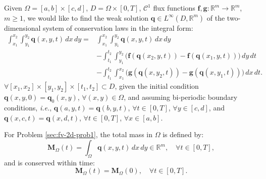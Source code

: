 \begin{prob}
	\label{sec:fv-2d-prob1}
	Given $\Omega = [a,b]\times [c,d]$, $D = \Omega \times [0,T]$, 
	$\mathcal{C}^1$ flux functions $\mathbf{f},
	\mathbf{g}: \mathbb{R}^m \to \mathbb{R}^m$,
	$m \geq 1$, we would like to find the weak solution
	$ \mathbf{q} \in L^{\infty}(D, \mathbb{R}^m)$ 
	of the two-dimensional system of conservation laws in the integral form:
	\begin{align*}
		\int_{x_1}^{x_2} \int_{y_1}^{y_2}
		\mathbf{q}(x, y, t) \,dx \,dy = &\int_{x_1}^{x_2} \int_{y_1}^{y_2}
		\mathbf{q}(x, y, t) \,dx \,dy \\ \nonumber
		&-\int_{t_1}^{t_2} \int_{y_1}^{y_2} \bigg(\mathbf{f}(\mathbf{q}(x_2, y, t))
		-\mathbf{f}(\mathbf{q}(x_1, y, t)) \bigg) \,dy \,dt\\ \nonumber
		&-\int_{t_1}^{t_2} \int_{x_1}^{x_2} \bigg(\mathbf{g}(\mathbf{q}(x, y_2, t))
		-\mathbf{g}(\mathbf{q}(x, y_1, t)) \bigg) \,dx \,dt.
	\end{align*}
	$\forall [x_1, x_2]\times [y_1, y_2] \times[t_1, t_2] \subset D$, 
	given the initial condition 
	$\mathbf{q}(x, y, 0) = \mathbf{q}_0(x, y)$, $\forall (x, y) \in \Omega$, 
	and assuming bi-periodic boundary conditions, \textit{i.e.}, 
	$\mathbf{q}(a,y,t) = \mathbf{q}(b,y,t)$, $\forall t \in [0,T]$, $\forall y \in [c,d]$, and
	$\mathbf{q}(x,c,t) = \mathbf{q}(x,d,t)$, $\forall t \in [0,T]$, $\forall x \in [a,b]$.
\end{prob}

For Problem \ref{sec:fv-2d-prob1}, the total mass in $\Omega$ is defined by: 
\begin{equation}
	\mathbf{M}_{\Omega}(t) = \int_{\Omega} \mathbf{q}(x,y,t) \,dx \,dy  \in \mathbb{R}^m, \quad \forall t \in [0,T],
\end{equation}
and is conserved within time: 
\begin{equation}
	\mathbf{M}_{\Omega}(t) = \mathbf{M}_{\Omega}(0), \quad \forall t \in [0,T].
\end{equation}

